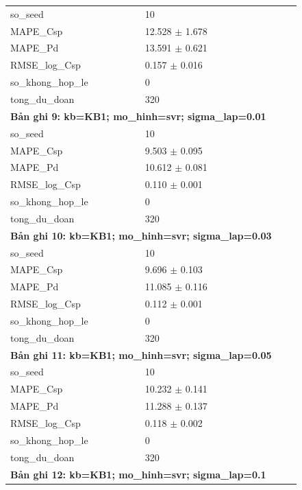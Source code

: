 \begin{longtable}{p{0.43\linewidth}p{0.50\linewidth}}
so\_\allowbreak seed & 10 \\
MAPE\_\allowbreak Csp & 12.528 $\pm$ 1.678 \\
MAPE\_\allowbreak Pd & 13.591 $\pm$ 0.621 \\
RMSE\_\allowbreak log\_\allowbreak Csp & 0.157 $\pm$ 0.016 \\
so\_\allowbreak khong\_\allowbreak hop\_\allowbreak le & 0 \\
tong\_\allowbreak du\_\allowbreak doan & 320 \\
\midrule
\multicolumn{2}{p{0.95\linewidth}}{\textbf{Bản ghi 9: kb=KB1; mo\_hinh=svr; sigma\_lap=0.01}} \\
so\_\allowbreak seed & 10 \\
MAPE\_\allowbreak Csp & 9.503 $\pm$ 0.095 \\
MAPE\_\allowbreak Pd & 10.612 $\pm$ 0.081 \\
RMSE\_\allowbreak log\_\allowbreak Csp & 0.110 $\pm$ 0.001 \\
so\_\allowbreak khong\_\allowbreak hop\_\allowbreak le & 0 \\
tong\_\allowbreak du\_\allowbreak doan & 320 \\
\midrule
\multicolumn{2}{p{0.95\linewidth}}{\textbf{Bản ghi 10: kb=KB1; mo\_hinh=svr; sigma\_lap=0.03}} \\
so\_\allowbreak seed & 10 \\
MAPE\_\allowbreak Csp & 9.696 $\pm$ 0.103 \\
MAPE\_\allowbreak Pd & 11.085 $\pm$ 0.116 \\
RMSE\_\allowbreak log\_\allowbreak Csp & 0.112 $\pm$ 0.001 \\
so\_\allowbreak khong\_\allowbreak hop\_\allowbreak le & 0 \\
tong\_\allowbreak du\_\allowbreak doan & 320 \\
\midrule
\multicolumn{2}{p{0.95\linewidth}}{\textbf{Bản ghi 11: kb=KB1; mo\_hinh=svr; sigma\_lap=0.05}} \\
so\_\allowbreak seed & 10 \\
MAPE\_\allowbreak Csp & 10.232 $\pm$ 0.141 \\
MAPE\_\allowbreak Pd & 11.288 $\pm$ 0.137 \\
RMSE\_\allowbreak log\_\allowbreak Csp & 0.118 $\pm$ 0.002 \\
so\_\allowbreak khong\_\allowbreak hop\_\allowbreak le & 0 \\
tong\_\allowbreak du\_\allowbreak doan & 320 \\
\midrule
\multicolumn{2}{p{0.95\linewidth}}{\textbf{Bản ghi 12: kb=KB1; mo\_hinh=svr; sigma\_lap=0.1}} \\

\end{longtable}
